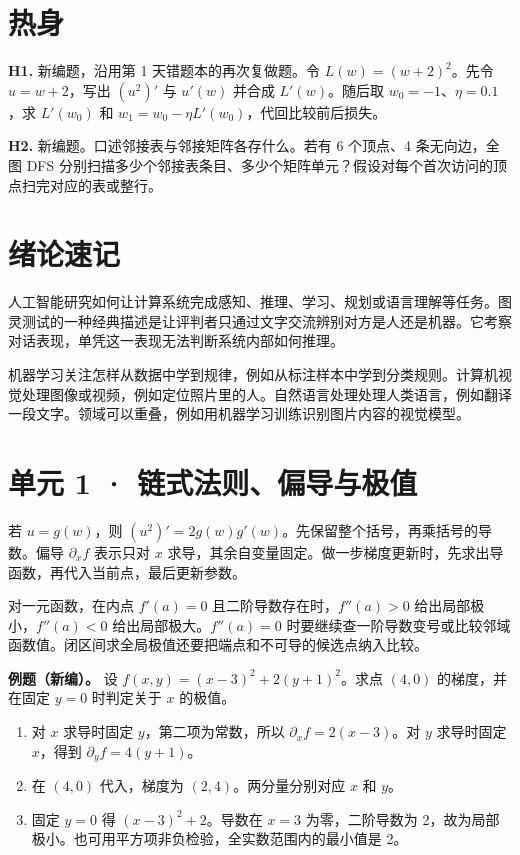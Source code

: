 \documentclass[UTF8,a4paper,11pt]{ctexart}
\begin{document}
\section{热身}
\textbf{H1.} 新编题，沿用第 1 天错题本的再次复做题。令 $L(w)=(w+2)^2$。先令 $u=w+2$，写出 $(u^2)'$ 与 $u'(w)$ 并合成 $L'(w)$。随后取 $w_0=-1$、$\eta=0.1$，求 $L'(w_0)$ 和 $w_1=w_0-\eta L'(w_0)$，代回比较前后损失。

\textbf{H2.} 新编题。口述邻接表与邻接矩阵各存什么。若有 6 个顶点、4 条无向边，全图 DFS 分别扫描多少个邻接表条目、多少个矩阵单元？假设对每个首次访问的顶点扫完对应的表或整行。

\section{绪论速记}
人工智能研究如何让计算系统完成感知、推理、学习、规划或语言理解等任务。图灵测试的一种经典描述是让评判者只通过文字交流辨别对方是人还是机器。它考察对话表现，单凭这一表现无法判断系统内部如何推理。

机器学习关注怎样从数据中学到规律，例如从标注样本中学到分类规则。计算机视觉处理图像或视频，例如定位照片里的人。自然语言处理处理人类语言，例如翻译一段文字。领域可以重叠，例如用机器学习训练识别图片内容的视觉模型。

\clearpage
\section{单元 1 · 链式法则、偏导与极值}
若 $u=g(w)$，则 $(u^2)'=2g(w)g'(w)$。先保留整个括号，再乘括号的导数。偏导 $\partial_x f$ 表示只对 $x$ 求导，其余自变量固定。做一步梯度更新时，先求出导函数，再代入当前点，最后更新参数。

对一元函数，在内点 $f'(a)=0$ 且二阶导数存在时，$f''(a)>0$ 给出局部极小，$f''(a)<0$ 给出局部极大。$f''(a)=0$ 时要继续查一阶导数变号或比较邻域函数值。闭区间求全局极值还要把端点和不可导的候选点纳入比较。

\textbf{例题（新编）。} 设 $f(x,y)=(x-3)^2+2(y+1)^2$。求点 $(4,0)$ 的梯度，并在固定 $y=0$ 时判定关于 $x$ 的极值。

\begin{enumerate}
\item 对 $x$ 求导时固定 $y$，第二项为常数，所以 $\partial_x f=2(x-3)$。对 $y$ 求导时固定 $x$，得到 $\partial_y f=4(y+1)$。
\item 在 $(4,0)$ 代入，梯度为 $(2,4)$。两分量分别对应 $x$ 和 $y$。
\item 固定 $y=0$ 得 $(x-3)^2+2$。导数在 $x=3$ 为零，二阶导数为 2，故为局部极小。也可用平方项非负检验，全实数范围内的最小值是 2。
\end{enumerate}
\end{document}
